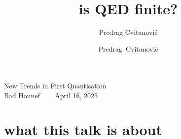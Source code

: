 



\usepackage{booktabs} %
\usepackage[font=scriptsize, labelfont=bf]{caption}
\usepackage[
    backend=biber,  %
    sorting=nyt,
    style=numeric, %
    natbib=true,
    style=phys, %
    biblabel= brackets, %
    articletitle=false, %
    pageranges = true , %
    sortlocale=en_US,
    firstinits=true,
    url=false, %
    doi=false, %
    eprint=false
]{biblatex}


\renewcommand{\Ssym}[1]{{\ensuremath{m_{#1}}}}    %




\title{
{\huge is QED finite?}
}
\author{Predrag Cvitanovi\'c}
\author[Cvitanovi\'c]
{
  \textcolor{green!50!black}{
  {Predrag~Cvitanovi\'c
  }	%
  }
}
\institute
{
New Trends in First Quantisation
\\
Bad Honnef ~~~ April 16, 2025\\[1ex]
 }
\date{} %

\begin{frame}
  \titlepage
\end{frame}

\section[what this talk is about]
 {what this talk is about}

